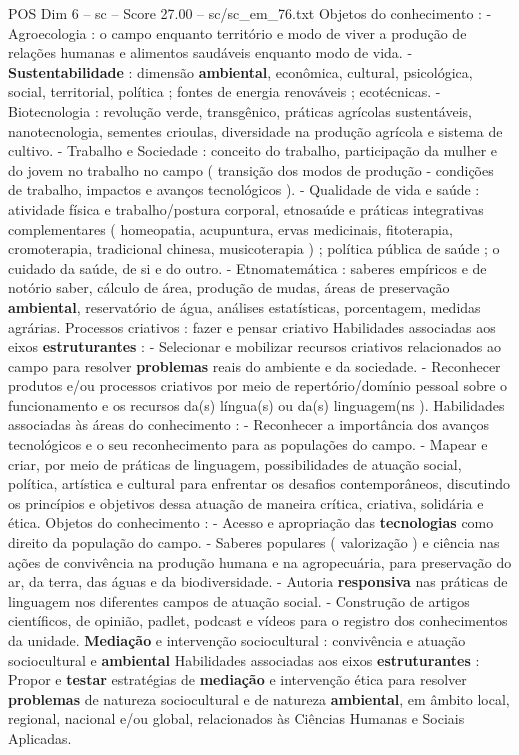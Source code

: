 \begin{textsample}{POS Dim 6 – sc – Score 27.00 – sc/sc\_em\_76.txt}
Objetos do conhecimento : - Agroecologia : o campo enquanto território e modo de viver a produção de relações humanas e alimentos saudáveis enquanto modo de vida. - \textbf{Sustentabilidade} : dimensão \textbf{ambiental}, econômica, cultural, psicológica, social, territorial, política ; fontes de energia renováveis ; ecotécnicas. - Biotecnologia : revolução verde, transgênico, práticas agrícolas sustentáveis, nanotecnologia, sementes crioulas, diversidade na produção agrícola e sistema de cultivo. - Trabalho e Sociedade : conceito do trabalho, participação da mulher e do jovem no trabalho no campo ( transição dos modos de produção - condições de trabalho, impactos e avanços tecnológicos ). - Qualidade de vida e saúde : atividade física e trabalho/postura corporal, etnosaúde e práticas integrativas complementares ( homeopatia, acupuntura, ervas medicinais, fitoterapia, cromoterapia, tradicional chinesa, musicoterapia ) ; política pública de saúde ; o cuidado da saúde, de si e do outro. - Etnomatemática : saberes empíricos e de notório saber, cálculo de área, produção de mudas, áreas de preservação \textbf{ambiental}, reservatório de água, análises estatísticas, porcentagem, medidas agrárias.
Processos criativos : fazer e pensar criativo Habilidades associadas aos eixos \textbf{estruturantes} : - Selecionar e mobilizar recursos criativos relacionados ao campo para resolver \textbf{problemas} reais do ambiente e da sociedade. - Reconhecer produtos e/ou processos criativos por meio de repertório/domínio pessoal sobre o funcionamento e os recursos da(s) língua(s) ou da(s) linguagem(ns ).
Habilidades associadas às áreas do conhecimento : - Reconhecer a importância dos avanços tecnológicos e o seu reconhecimento para as populações do campo. - Mapear e criar, por meio de práticas de linguagem, possibilidades de atuação social, política, artística e cultural para enfrentar os desafios contemporâneos, discutindo os princípios e objetivos dessa atuação de maneira crítica, criativa, solidária e ética.
Objetos do conhecimento : - Acesso e apropriação das \textbf{tecnologias} como direito da população do campo. - Saberes populares ( valorização ) e ciência nas ações de convivência na produção humana e na agropecuária, para preservação do ar, da terra, das águas e da biodiversidade. - Autoria \textbf{responsiva} nas práticas de linguagem nos diferentes campos de atuação social. - Construção de artigos científicos, de opinião, padlet, podcast e vídeos para o registro dos conhecimentos da unidade. \textbf{Mediação} e intervenção sociocultural : convivência e atuação sociocultural e \textbf{ambiental} Habilidades associadas aos eixos \textbf{estruturantes} : Propor e \textbf{testar} estratégias de \textbf{mediação} e intervenção ética para resolver \textbf{problemas} de natureza sociocultural e de natureza \textbf{ambiental}, em âmbito local, regional, nacional e/ou global, relacionados às Ciências Humanas e Sociais Aplicadas.

\end{textsample}
